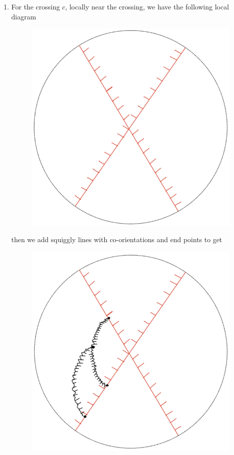 \begin{definition}
\begin{enumerate}[label = (\roman*)]
\item For the crossing $c$, locally near the crossing, we have the following local diagram
\begin{figure}[H] 
    \centering
    \includegraphics[scale = 0.55]{diagrams/local_systems_on_as_diagrams/9.png} 
    \caption{}
    \label{fig:your-label}
\end{figure}
then we add squiggly lines with co-orientations and end points to get
\begin{figure}[H] 
    \centering
    \includegraphics[scale = 0.55]{diagrams/local_systems_on_as_diagrams/10.png} 

\end{figure}
\end{enumerate}
\end{definition}
